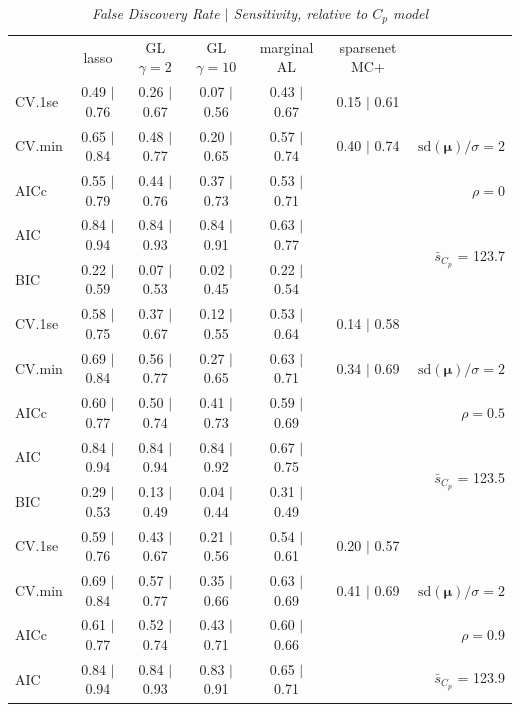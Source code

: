 \documentclass[12pt]{article}
\newcommand{\mr}[1]{\mathrm{#1}}
\newcommand{\bm}[1]{\mathbf{#1}}
\begin{document}
\begin{table}[p]\vspace{-.5cm}
\caption[l]{\it False Discovery Rate $\mid$ Sensitivity, relative to $C_p$ model\hfill}
\vspace{-.5cm}
\small{}
\begin{center}
\begin{tabular}{l*{5}{c}|r}
 & lasso & GL $\gamma=2$ & GL $\gamma=10$ & marginal AL & sparsenet MC+  & \\
 \cline{1-7}
CV.1se & 0.49 $\mid$ 0.76 & 0.26 $\mid$ 0.67 & 0.07 $\mid$ 0.56 & 0.43 $\mid$ 0.67 & 0.15 $\mid$ 0.61 &\\
CV.min & 0.65 $\mid$ 0.84 & 0.48 $\mid$ 0.77 & 0.20 $\mid$ 0.65 & 0.57 $\mid$ 0.74 & 0.40 $\mid$ 0.74 &  $\mr{sd}(\bm{\mu})/\sigma=2$ \\
AICc & 0.55 $\mid$ 0.79 & 0.44 $\mid$ 0.76 & 0.37 $\mid$ 0.73 & 0.53 $\mid$ 0.71 & & $\rho=0$ \\
AIC & 0.84 $\mid$ 0.94 & 0.84 $\mid$ 0.93 & 0.84 $\mid$ 0.91 & 0.63 $\mid$ 0.77 & & \multirow{2}{*}{$\bar{s}_{C_p}$ = 123.7} \\
BIC & 0.22 $\mid$ 0.59 & 0.07 $\mid$ 0.53 & 0.02 $\mid$ 0.45 & 0.22 $\mid$ 0.54 & & \\
 \hline 
CV.1se & 0.58 $\mid$ 0.75 & 0.37 $\mid$ 0.67 & 0.12 $\mid$ 0.55 & 0.53 $\mid$ 0.64 & 0.14 $\mid$ 0.58 &\\
CV.min & 0.69 $\mid$ 0.84 & 0.56 $\mid$ 0.77 & 0.27 $\mid$ 0.65 & 0.63 $\mid$ 0.71 & 0.34 $\mid$ 0.69 &  $\mr{sd}(\bm{\mu})/\sigma=2$ \\
AICc & 0.60 $\mid$ 0.77 & 0.50 $\mid$ 0.74 & 0.41 $\mid$ 0.73 & 0.59 $\mid$ 0.69 & & $\rho=0.5$ \\
AIC & 0.84 $\mid$ 0.94 & 0.84 $\mid$ 0.94 & 0.84 $\mid$ 0.92 & 0.67 $\mid$ 0.75 & & \multirow{2}{*}{$\bar{s}_{C_p}$ = 123.5} \\
BIC & 0.29 $\mid$ 0.53 & 0.13 $\mid$ 0.49 & 0.04 $\mid$ 0.44 & 0.31 $\mid$ 0.49 & & \\
 \hline 
CV.1se & 0.59 $\mid$ 0.76 & 0.43 $\mid$ 0.67 & 0.21 $\mid$ 0.56 & 0.54 $\mid$ 0.61 & 0.20 $\mid$ 0.57 &\\
CV.min & 0.69 $\mid$ 0.84 & 0.57 $\mid$ 0.77 & 0.35 $\mid$ 0.66 & 0.63 $\mid$ 0.69 & 0.41 $\mid$ 0.69 &  $\mr{sd}(\bm{\mu})/\sigma=2$ \\
AICc & 0.61 $\mid$ 0.77 & 0.52 $\mid$ 0.74 & 0.43 $\mid$ 0.71 & 0.60 $\mid$ 0.66 & & $\rho=0.9$ \\
AIC & 0.84 $\mid$ 0.94 & 0.84 $\mid$ 0.93 & 0.83 $\mid$ 0.91 & 0.65 $\mid$ 0.71 & & \multirow{2}{*}{$\bar{s}_{C_p}$ = 123.9} \\

\end{tabular}
\end{center}
\end{table}
\end{document}
